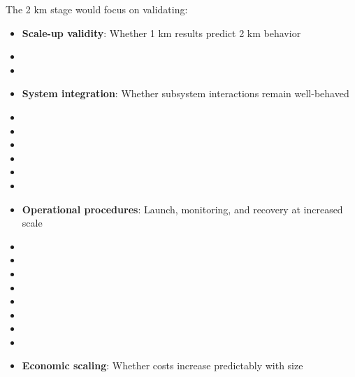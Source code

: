 The 2 km stage would focus on validating:
\begin{itemize}
    \item \textbf{Scale-up validity}: Whether 1 km results predict 2 km behavior \cite{barenblatt2003}
    \item \item \item \textbf{System integration}: Whether subsystem interactions remain well-behaved \cite{antsaklis2007}
    \item \item \item \item \item \item \item \textbf{Operational procedures}: Launch, monitoring, and recovery at increased scale \cite{huffman2010}
    \item \item \item \item \item \item \item \item \item \textbf{Economic scaling}: Whether costs increase predictably with size \cite{huffman2010}
\end{itemize}

